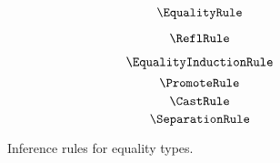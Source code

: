 
\begin{figure}
    \centering
    \begin{minipage}{0.5\textwidth}
        $$\EqualityRule$$
    \end{minipage}%
    \begin{minipage}{0.5\textwidth}
        $$\ReflRule$$
    \end{minipage}%
    $$\EqualityInductionRule$$
    $$\PromoteRule$$
    $$\CastRule$$
    $$\SeparationRule$$
    \caption{
        Inference rules for equality types.
    }
\end{figure}
